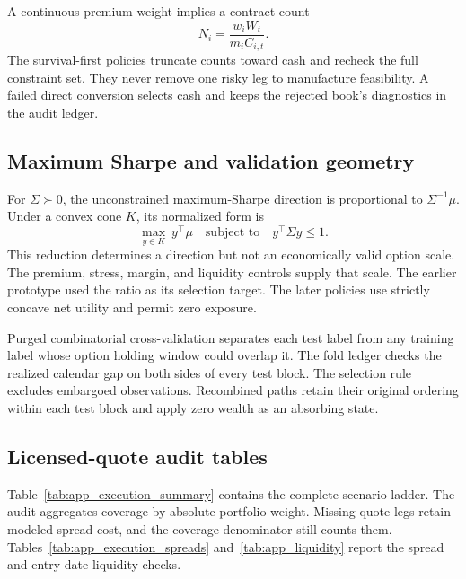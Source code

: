 A continuous premium weight implies a contract count
\[
 N_i=\frac{w_iW_t}{m_iC_{i,t}}.
\]
The survival-first policies truncate counts toward cash and recheck the full constraint
set. They never remove one risky leg to manufacture feasibility. A failed direct
conversion selects cash and keeps the rejected book's diagnostics in the audit ledger.

\subsection{Maximum Sharpe and validation geometry}

For \(\Sigma\succ0\), the unconstrained maximum-Sharpe direction is proportional to
\(\Sigma^{-1}\mu\). Under a convex cone \(K\), its normalized form is
\[
 \max_{y\in K}\ y^\top\mu
 \quad\text{subject to}\quad
 y^\top\Sigma y\le 1.
\]
This reduction determines a direction but not an economically valid option scale. The
premium, stress, margin, and liquidity controls supply that scale. The earlier prototype
used the ratio as its selection target. The later policies use strictly concave net
utility and permit zero exposure.

Purged combinatorial cross-validation separates each test label from any training label
whose option holding window could overlap it. The fold ledger checks the realized calendar
gap on both sides of every test block. The selection rule excludes embargoed observations.
Recombined paths retain their original ordering within each test block and apply zero
wealth as an absorbing state.

\FloatBarrier
\subsection{Licensed-quote audit tables}\label{app:audit_tables}

Table~\ref{tab:app_execution_summary} contains the complete scenario ladder. The audit
aggregates coverage by absolute portfolio weight. Missing quote legs retain modeled spread
cost, and the coverage denominator still counts them. Tables~\ref{tab:app_execution_spreads}
and~\ref{tab:app_liquidity} report the spread and entry-date liquidity checks.

\begin{table}[t]
\centering
\caption{High Ceiling annualized return, Sortino, drawdown, and quote coverage under the
frozen modeled, mid, touch, and worst scenarios.}
\label{tab:app_execution_summary}
\resizebox{\textwidth}{!}{}
\end{table}

